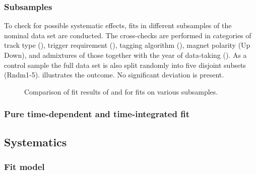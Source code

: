 \subsubsection{Subsamples}
\label{sec:measurement_of_sin2beta:systematics:cross_checks:subsamples}
%
To check for possible systematic effects, fits in different subsamples of the
nominal data set are conducted. The cross-checks are performed in categories of
track type (\catDD \vs \catLL), trigger requirement (\catAU \vs \catEB), tagging
algorithm (\catOS \vs \catSS \vs \catBS), magnet polarity (Up \vs Down), and
admixtures of those together with the year of data-taking (\catOO \vs \catOT).
As a control sample the full data set is also split randomly into five disjoint
subsets (Rndm1-5). 
illustrates the outcome. No significant deviation is present.
%
\begin{figure}
\centering


\caption{
Comparison of fit results of \SJpsiKS and \CJpsiKS for fits on various
subsamples.}
\label{fig:measurement_of_sin2beta:systematics:cross_checks:subsamples:s_and_c}
\end{figure}

\subsubsection{Pure time-dependent and time-integrated fit}
\label{sec:measurement_of_sin2beta:systematics:cross_checks:time_integrated}


\subsection{Systematics}
\label{sec:measurement_of_sin2beta:systematics:systematics}


\subsubsection{Fit model}
\label{sec:measurement_of_sin2beta:systematics:systematics:fit_model}

